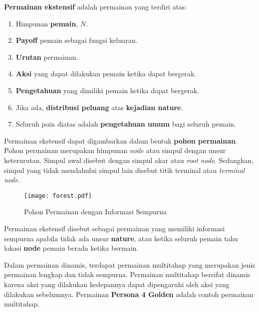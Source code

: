 \begin{definisi}
    \textbf{Permainan ekstensif} adalah permainan yang terdiri atas:
    \begin{enumerate}
        \item Himpunan \textbf{pemain}, $N$.
        \item \textbf{Payoff} pemain sebagai fungsi keluaran.
        \item \textbf{Urutan} permainan.
        \item \textbf{Aksi} yang dapat dilakukan pemain ketika dapat bergerak.
        \item \textbf{Pengetahuan} yang dimiliki pemain ketika dapat bergerak.
        \item Jika ada, \textbf{distribusi peluang} atas \textbf{kejadian nature}.
        \item Seluruh poin diatas adalah \textbf{pengetahuan umum} bagi seluruh pemain.
    \end{enumerate}
\end{definisi}

Permainan ekstensif dapat digambarkan dalam bentuk \textbf{pohon permainan}. Pohon permainan merupakan himpunan \textit{node} atau simpul dengan unsur keterurutan. Simpul awal disebut dengan simpul akar atau \textit{root node}. Sedangkan, simpul yang tidak mendahului simpul lain disebut titik terminal atau \textit{terminal node}.

\begin{figure}[h]
    \centering
    \texttt{[image: forest.pdf]}
    \caption{Pohon Permainan dengan Informasi Sempurna}
\end{figure}

\begin{definisi}
    Permainan ekstensif disebut sebagai permainan yang memiliki informasi sempurna apabila tidak ada unsur \textbf{nature}, atau ketika seluruh pemain tahu lokasi \textbf{node} pemain berada ketika bermain.
\end{definisi}

Dalam permainan dinamis, terdapat permainan multitahap yang merupakan jenis permainan lengkap dan tidak sempurna. Permainan multitahap bersifat dinamis karena aksi yang dilakukan kedepannya dapat dipengaruhi oleh aksi yang dilakukan sebelumnya. Permainan \textbf{Persona 4 Golden} adalah contoh permainan multitahap.


